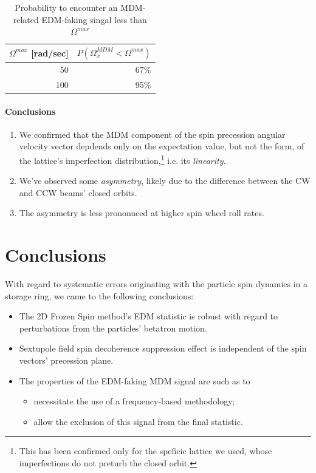 \documentclass[]{elsarticle}
\newcommand{\W}{\Omega}
\begin{document}
\begin{table}[h]\centering
  \caption{Probability to encounter an MDM-related EDM-faking singal less than $\W^{max}$\label{tbl:MDM_CI}}
  \begin{tabular}{rr}
    \hline
    $\W^{max}$ [rad/sec] & $P(\W_x^{MDM} < \W^{max})$ \\
    \hline
    50 & 67\% \\
    100 & 95\% \\
    \hline
  \end{tabular}
\end{table}

\paragraph{Conclusions}
\begin{enumerate}[(1)]
\item We confirmed that the MDM component of the spin precession angular velocity vector depdends only on the
  expectation value, but not the form, of the lattice's imperfection distribution,\footnote{This has been
    confirmed only for the speficic lattice we used, whose imperfections do not preturb the closed orbit.}
  i.e. its \emph{linearity}.
\item We've observed some \emph{asymmetry}, likely due to the difference between the
  CW and CCW beams' closed orbits.
\item The asymmetry is less prononuced at higher spin wheel roll rates.
\end{enumerate}

\section{Conclusions}
With regard to systematic errors originating with the particle spin dynamics in a storage ring,
we came to the following conclusions:
\begin{itemize}
\item The 2D Frozen Spin method's EDM statistic is robust with regard to perturbations from the particles'
  betatron motion.
\item Sextupole field spin decoherence suppression effect is independent of the spin vectors'
  precession plane.
\item The properties of the EDM-faking MDM signal are such as to
  \begin{itemize}
  \item necessitate the use of a frequency-based methodology;
  \item allow the exclusion of this signal from the final statistic.
  \end{itemize}
\end{itemize}
\end{document}
